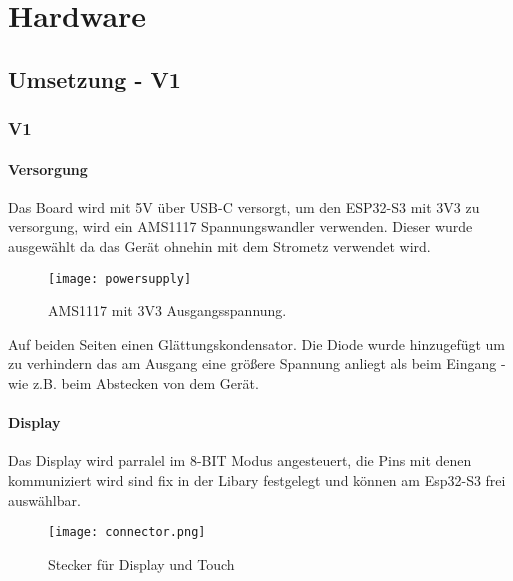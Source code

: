 \graphicspath{ {HW-PIC/} }


\chapter{Hardware}

    \section{Umsetzung - V1}
    
    \subsection{V1}
        \subsubsection{Versorgung}
        Das Board wird mit 5V über USB-C versorgt, um den ESP32-S3 mit 3V3 zu 
        versorgung, wird ein AMS1117 Spannungswandler verwenden. Dieser wurde ausgewählt
        da das Gerät ohnehin mit dem Strometz verwendet wird. 
            \begin{figure}[h]
                \centering
                \texttt{[image: powersupply]}
                \caption{AMS1117 mit 3V3 Ausgangsspannung.}
                \label{fig:sch1}
                
            \end{figure}

        Auf beiden Seiten einen Glättungskondensator. Die Diode wurde hinzugefügt um zu verhindern das am Ausgang eine größere Spannung
        anliegt als beim Eingang - wie z.B. beim Abstecken von dem Gerät.

        \newpage
        \subsubsection{Display}
        Das Display wird parralel im 8-BIT Modus angesteuert, die Pins mit denen 
        kommuniziert wird sind fix in der Libary festgelegt und können am Esp32-S3 
        frei auswählbar. 

            \begin{figure}[h!]
                \centering
                \texttt{[image: connector.png]}
                \caption{Stecker für Display und Touch}
                \label{fig:sch2}

            \end{figure}

